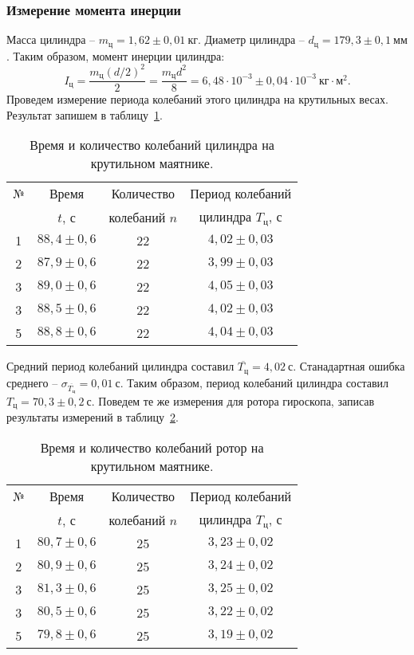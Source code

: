 \documentclass[a4paper,11pt]{article}
\begin{document}
\subsubsection{Измерение момента инерции} %
Масса цилиндра -- $m_{ц} = 1,62 \pm 0,01\ кг$.\newline
Диаметр цилиндра -- $d_{ц} = 179,3 \pm 0,1\ мм$.\newline
Таким образом, момент инерции цилиндра: $$I_{ц} = \frac{m_{ц}(d/2)^{2}}{2} = \frac{m_{ц}d^{2}}{8} = 6,48 \cdot 10^{-3} \pm 0,04 \cdot 10^{-3}\ кг \cdot м^{2}.$$
Проведем измерение периода колебаний этого цилиндра на крутильных весах. Результат запишем в таблицу~\ref{table:tab6}.
\begin{table}[h!]
\centering
\begin{tabular}{ ||c|c|c|c|| }
  \hline
  № & Время & Количество & Период колебаний \\
   & $t$, $с$ & колебаний $n$ & цилиндра $T_{ц}$, $с$ \\
  \hline
  1 & $88,4 \pm 0,6$ & 22 & $4,02 \pm 0,03$ \\
  2 & $87,9 \pm 0,6$ & 22 & $3,99 \pm 0,03$ \\
  3 & $89,0 \pm 0,6$ & 22 & $4,05 \pm 0,03$ \\
  3 & $88,5 \pm 0,6$ & 22 & $4,02 \pm 0,03$ \\
  5 & $88,8 \pm 0,6$ & 22 & $4,04 \pm 0,03$ \\
  \hline
\end{tabular}
\caption{Время и количество колебаний цилиндра на крутильном маятнике.}
\label{table:tab6}
\end{table}\newline
Средний период колебаний цилиндра составил $\overline{T_{ц}} = 4,02\ с$.\newline
Станадартная ошибка среднего -- $\sigma_{\overline{T_{ц}}}= 0,01\ с$.\newline
Таким образом, период колебаний цилиндра составил $T_{ц} = 70,3 \pm 0,2\ с$.\newline
Поведем те же измерения для ротора гироскопа, записав результаты измерений в таблицу~\ref{table:tab7}.
\begin{table}[h!]
\centering
\begin{tabular}{ ||c|c|c|c|| }
  \hline
  № & Время & Количество & Период колебаний \\
   & $t$, $с$ & колебаний $n$ & цилиндра $T_{ц}$, $с$ \\
  \hline
  1 & $80,7 \pm 0,6$ & 25 & $3,23 \pm 0,02$ \\
  2 & $80,9 \pm 0,6$ & 25 & $3,24 \pm 0,02$ \\
  3 & $81,3 \pm 0,6$ & 25 & $3,25 \pm 0,02$ \\
  3 & $80,5 \pm 0,6$ & 25 & $3,22 \pm 0,02$ \\
  5 & $79,8 \pm 0,6$ & 25 & $3,19 \pm 0,02$ \\
  \hline
\end{tabular}
\caption{Время и количество колебаний ротор на крутильном маятнике.}
\label{table:tab7}
\end{table}\newline
\end{document}
